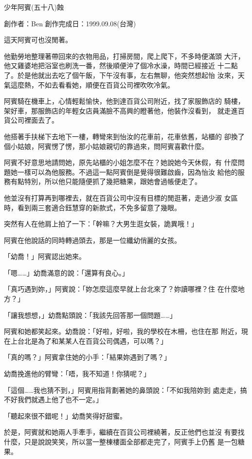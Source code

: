 



少年阿賓(五十八)蝕

創作者：Ben
創作完成日：1999.09.08(台灣)　


這天阿賓可也沒閒著。

他勤勞地整理著帶回來的衣物用品，打掃房間，爬上爬下，不多時便滿頭
大汗，他又雞婆地把浴室也刷洗一番，然後順便沖了個冷水澡，時間已經接近
十二點了。於是他就出去吃了個午飯，下午沒有事，左右無聊，他突然想起怡
汝來，天氣這麼熱，不如去看看她，順便在百貨公司裡吹吹冷氣。

阿賓騎在機車上，心情輕鬆愉快，他到達百貨公司附近，找了家服飾店的
騎樓，架好車，那服飾店的年輕女店員滿臉不高興的瞪著他，他裝作沒看到，
就走進百貨公司裡面去了。

他搭著手扶梯下去地下一樓，轉彎來到怡汝的花車前，花車依舊，站櫃的
卻換了個小姑娘，阿賓愣了愣，那小姑娘親切的靠過來，問阿賓喜歡什麼。

阿賓不好意思地請問她，原先站櫃的小姐怎麼不在？她說她今天休假，有
什麼問題她一樣可以為他服務。不過這一點阿賓倒是覺得很難啟齒，因為怡汝
給他的服務有點特別，所以他只能隨便抓了幾把糖果，跟她會過帳便走了。

他並沒有打算再到哪裡去，就在百貨公司中沒有目標的閒逛著，走過少淑
女區時，看到兩三套適合鈺慧穿的新款式，不免多留意了幾眼。

突然有人在他肩上拍了一下：「幹嘛？大男生逛女裝，詭異哦！」

阿賓在他說話的同時轉過頭去，那是一位纖幼俏麗的女孩。

「幼喬！」阿賓認出她來。

「嗯……」幼喬滿意的說：「還算有良心。」

「真巧遇到妳，」阿賓說：「妳怎麼這麼早就上台北來了？妳讀哪裡？住
在什麼地方？」

「讓我想想，」幼喬點頭說：「我該先回答那一個問題……」

阿賓和她都笑起來。幼喬說：「好啦，好啦，我的學校在木柵，也住在那
附近，現在上台北是為了和某某人在百貨公司偶遇，可以嗎？」

「真的嗎？」阿賓拿住她的小手：「結果妳遇到了嗎？」

幼喬挽進他的臂彎：「唔，我不知道！你猜呢？」

「這個……我也猜不到，」阿賓用指背劃著她的鼻頭說：「不如我陪妳到
處走走，搞不好我們就遇上他了也不一定。」

「聽起來很不錯呢！」幼喬笑得好甜蜜。

於是，阿賓就和她兩人手牽手，繼續在百貨公司裡繞著，反正他們也並沒
有要找什麼，只是說說笑笑，所以當一整棟樓面全部都走完了，阿賓手上仍舊
是一包糖果。

